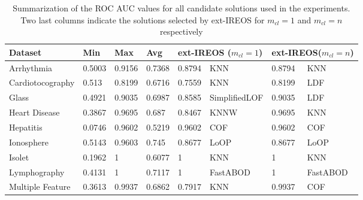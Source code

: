 \begin{table}[ht!]
\centering
\captionsetup{justification=centering}
\caption{Summarization of the ROC AUC values for all candidate solutions used in the experiments. Two last columns indicate the solutions selected by ext-IREOS for $m_{cl} = 1$ and $m_{cl} = n$ respectively}
\label{tab:model_selection}
\begin{tabular}{@{}llllllll@{}}
\toprule
\multicolumn{1}{l}{Dataset} & Min & Max & \multicolumn{1}{l}{Avg} & \multicolumn{2}{l}{ext-IREOS ($m_{cl} = 1$)} & \multicolumn{2}{l}{ext-IREOS($m_{cl} = n$)} \\ \midrule
\multicolumn{1}{l|}{Arrhythmia}        &  0.5003   &   0.9156  & \multicolumn{1}{l|}{0.7368}    &     0.8794     & \multicolumn{1}{l|}{KNN}         &         0.8794           &       KNN             \\
\multicolumn{1}{l|}{Cardiotocography}        &    0.513 &   0.8199  & \multicolumn{1}{l|}{0.6716}    &     0.7559     & \multicolumn{1}{l|}{KNN}         &     0.8199               &     LDF               \\
\multicolumn{1}{l|}{Glass}        &  0.4921   &  0.9035   & \multicolumn{1}{l|}{0.6987}    &     0.8585     & \multicolumn{1}{l|}{SimplifiedLOF}         &      0.9035              &        LDF            \\
\multicolumn{1}{l|}{Heart Disease}        &   0.3867  &  0.9695   & \multicolumn{1}{l|}{0.687}    &    0.8467      & \multicolumn{1}{l|}{KNNW}         &        0.9695            &      KNN              \\
\multicolumn{1}{l|}{Hepatitis}        &  0.0746   &  0.9602   & \multicolumn{1}{l|}{0.5219}    &     0.9602     & \multicolumn{1}{l|}{COF}         &           0.9602         &          COF          \\
\multicolumn{1}{l|}{Ionosphere}        &  0.5143   &  0.9603   & \multicolumn{1}{l|}{0.745}    &   0.8677       & \multicolumn{1}{l|}{LoOP}         &          0.8677          &        LoOP            \\
\multicolumn{1}{l|}{Isolet}        &  0.1962   &  1   & \multicolumn{1}{l|}{0.6077}    &     1     & \multicolumn{1}{l|}{KNN}         &            1        &               KNN     \\
\multicolumn{1}{l|}{Lymphography}        &   0.4131  &   1  & \multicolumn{1}{l|}{0.7117}    &     1     & \multicolumn{1}{l|}{FastABOD}         &              1      &          FastABOD          \\
\multicolumn{1}{l|}{Multiple Feature}        &  0.3613   &  0.9937   & \multicolumn{1}{l|}{0.6862}    &     0.7917     & \multicolumn{1}{l|}{KNN}         &       0.9937             &       COF             \\

\end{tabular}
\end{table}
